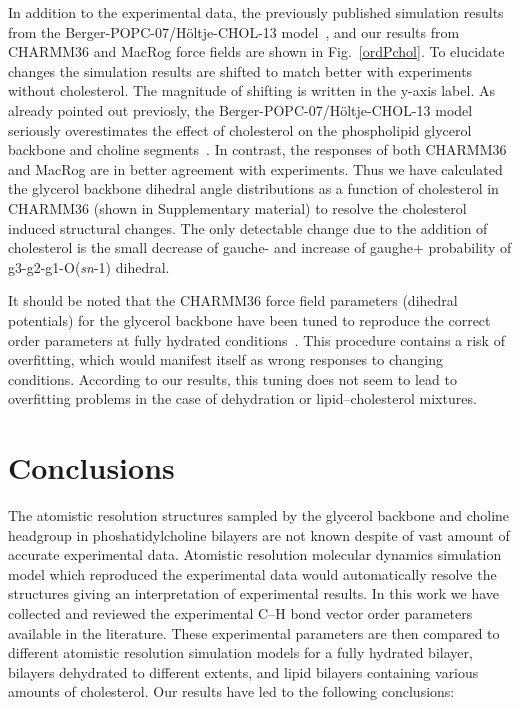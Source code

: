 \documentclass[journal=jacsat,manuscript=article]{achemso}
\begin{document}
In addition to the experimental data, the previously published simulation results from the Berger-POPC-07/H\"oltje-CHOL-13 model~\cite{ferreira13},
and our results from CHARMM36 and MacRog force fields are shown in Fig.~\ref{ordPchol}. 
To elucidate changes the simulation results are shifted to match better with experiments without cholesterol.
The magnitude of shifting is written in the y-axis label.
As already pointed out previosly, the Berger-POPC-07/H\"oltje-CHOL-13 model
seriously overestimates the effect of cholesterol on the phospholipid glycerol backbone and choline segments~\cite{ferreira13}.
In contrast, the responses of both CHARMM36 and MacRog are in better agreement with experiments. 
Thus we have calculated the glycerol backbone dihedral angle distributions
as a function of cholesterol in CHARMM36 (shown in Supplementary material) to resolve the cholesterol induced structural changes. The only detectable change due to the
addition of cholesterol is the small decrease of gauche- and increase of gaughe+ probability of g3-g2-g1-O(\textit{sn}-1) dihedral.


It should be noted that the CHARMM36 force field parameters (dihedral potentials) for the glycerol backbone have been tuned to reproduce the correct order parameters at fully hydrated conditions~\cite{klauda10}. 
This procedure contains a risk of overfitting, which would manifest itself as wrong responses to changing conditions. 
According to our results, this tuning does not seem to lead to overfitting problems in the case of dehydration or lipid--cholesterol mixtures. 


\pagebreak
\section{Conclusions}
The atomistic resolution structures sampled by the glycerol backbone and choline headgroup
in phoshatidylcholine bilayers are not known despite of vast amount of accurate experimental
data. Atomistic resolution molecular dynamics simulation model which reproduced the
experimental data would automatically resolve the structures giving an interpretation of experimental results.
In this work we have collected and reviewed the experimental C--H bond vector order
parameters available in the literature. These experimental parameters are then compared to
different atomistic resolution simulation models for a fully hydrated bilayer, bilayers dehydrated to different extents, and
lipid bilayers containing various amounts of cholesterol. Our results have led to the following conclusions:
\end{document}
